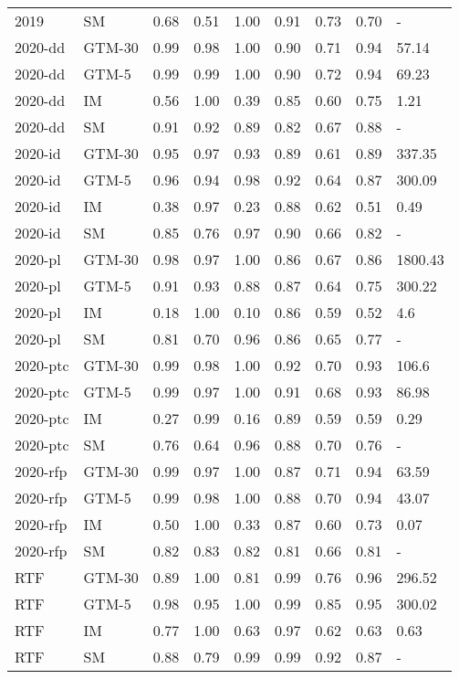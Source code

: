 \begin{tabular}{llrrrrrrl}
2019 & SM & 0.68 & 0.51 & 1.00 & 0.91 & 0.73 & 0.70 & - \\
2020-dd & GTM-30 & 0.99 & 0.98 & 1.00 & 0.90 & 0.71 & 0.94 & 57.14 \\
2020-dd & GTM-5 & 0.99 & 0.99 & 1.00 & 0.90 & 0.72 & 0.94 & 69.23 \\
2020-dd & IM & 0.56 & 1.00 & 0.39 & 0.85 & 0.60 & 0.75 & 1.21 \\
2020-dd & SM & 0.91 & 0.92 & 0.89 & 0.82 & 0.67 & 0.88 & - \\
2020-id & GTM-30 & 0.95 & 0.97 & 0.93 & 0.89 & 0.61 & 0.89 & 337.35 \\
2020-id & GTM-5 & 0.96 & 0.94 & 0.98 & 0.92 & 0.64 & 0.87 & 300.09 \\
2020-id & IM & 0.38 & 0.97 & 0.23 & 0.88 & 0.62 & 0.51 & 0.49 \\
2020-id & SM & 0.85 & 0.76 & 0.97 & 0.90 & 0.66 & 0.82 & - \\
2020-pl & GTM-30 & 0.98 & 0.97 & 1.00 & 0.86 & 0.67 & 0.86 & 1800.43 \\
2020-pl & GTM-5 & 0.91 & 0.93 & 0.88 & 0.87 & 0.64 & 0.75 & 300.22 \\
2020-pl & IM & 0.18 & 1.00 & 0.10 & 0.86 & 0.59 & 0.52 & 4.6 \\
2020-pl & SM & 0.81 & 0.70 & 0.96 & 0.86 & 0.65 & 0.77 & - \\
2020-ptc & GTM-30 & 0.99 & 0.98 & 1.00 & 0.92 & 0.70 & 0.93 & 106.6 \\
2020-ptc & GTM-5 & 0.99 & 0.97 & 1.00 & 0.91 & 0.68 & 0.93 & 86.98 \\
2020-ptc & IM & 0.27 & 0.99 & 0.16 & 0.89 & 0.59 & 0.59 & 0.29 \\
2020-ptc & SM & 0.76 & 0.64 & 0.96 & 0.88 & 0.70 & 0.76 & - \\
2020-rfp & GTM-30 & 0.99 & 0.97 & 1.00 & 0.87 & 0.71 & 0.94 & 63.59 \\
2020-rfp & GTM-5 & 0.99 & 0.98 & 1.00 & 0.88 & 0.70 & 0.94 & 43.07 \\
2020-rfp & IM & 0.50 & 1.00 & 0.33 & 0.87 & 0.60 & 0.73 & 0.07 \\
2020-rfp & SM & 0.82 & 0.83 & 0.82 & 0.81 & 0.66 & 0.81 & - \\
RTF & GTM-30 & 0.89 & 1.00 & 0.81 & 0.99 & 0.76 & 0.96 & 296.52 \\
RTF & GTM-5 & 0.98 & 0.95 & 1.00 & 0.99 & 0.85 & 0.95 & 300.02 \\
RTF & IM & 0.77 & 1.00 & 0.63 & 0.97 & 0.62 & 0.63 & 0.63 \\
RTF & SM & 0.88 & 0.79 & 0.99 & 0.99 & 0.92 & 0.87 & - \\

\end{tabular}
